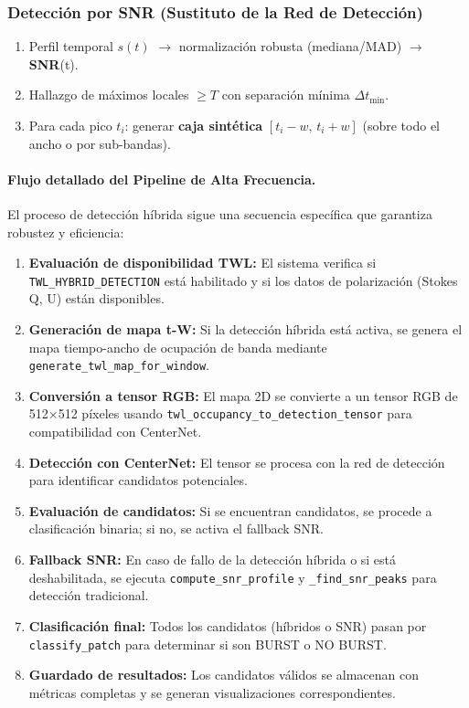 \subsubsection{Detección por SNR (Sustituto de la Red de Detección)}

\begin{enumerate}
  \item Perfil temporal $s(t)$ \(\rightarrow\) normalización robusta (mediana/MAD) \(\rightarrow\) \textbf{SNR}(t).
  \item Hallazgo de máximos locales $\ge T$ con separación mínima $\Delta t_{\min}$.
  \item Para cada pico $t_i$: generar \textbf{caja sintética} $[t_i-w,\, t_i+w]$ (sobre todo el ancho o por sub-bandas).
\end{enumerate}

\paragraph{Flujo detallado del Pipeline de Alta Frecuencia.} El proceso de detección híbrida sigue una secuencia específica que garantiza robustez y eficiencia:

\begin{enumerate}
\item \textbf{Evaluación de disponibilidad TWL:} El sistema verifica si \texttt{TWL\_HYBRID\_DETECTION} está habilitado y si los datos de polarización (Stokes Q, U) están disponibles.
\item \textbf{Generación de mapa t-W:} Si la detección híbrida está activa, se genera el mapa tiempo-ancho de ocupación de banda mediante \texttt{generate\_twl\_map\_for\_window}.
\item \textbf{Conversión a tensor RGB:} El mapa 2D se convierte a un tensor RGB de 512×512 píxeles usando \texttt{twl\_occupancy\_to\_detection\_tensor} para compatibilidad con CenterNet.
\item \textbf{Detección con CenterNet:} El tensor se procesa con la red de detección para identificar candidatos potenciales.
\item \textbf{Evaluación de candidatos:} Si se encuentran candidatos, se procede a clasificación binaria; si no, se activa el fallback SNR.
\item \textbf{Fallback SNR:} En caso de fallo de la detección híbrida o si está deshabilitada, se ejecuta \texttt{compute\_snr\_profile} y \texttt{\_find\_snr\_peaks} para detección tradicional.
\item \textbf{Clasificación final:} Todos los candidatos (híbridos o SNR) pasan por \texttt{classify\_patch} para determinar si son BURST o NO BURST.
\item \textbf{Guardado de resultados:} Los candidatos válidos se almacenan con métricas completas y se generan visualizaciones correspondientes.
\end{enumerate}

